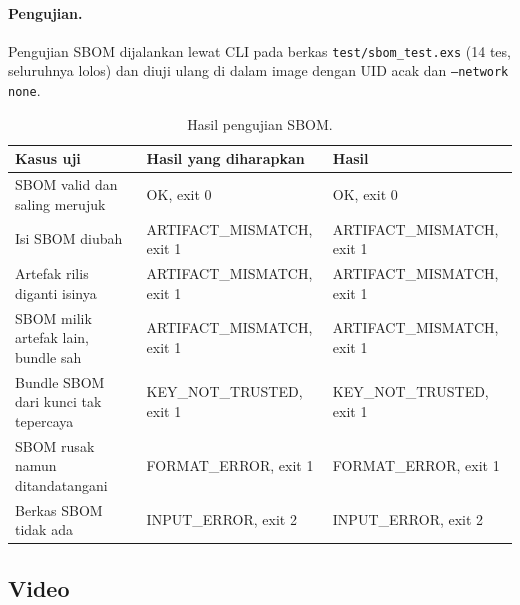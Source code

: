 \paragraph{Pengujian.}
Pengujian SBOM dijalankan lewat CLI pada berkas \texttt{test/sbom\_test.exs} (14 tes, seluruhnya
lolos) dan diuji ulang di dalam image dengan UID acak dan \texttt{--network none}.

\begin{table}[H]
\centering
\begin{tabular}{@{}lll@{}}
\toprule
Kasus uji & Hasil yang diharapkan & Hasil \\
\midrule
SBOM valid dan saling merujuk & OK, exit 0 & OK, exit 0 \\
Isi SBOM diubah & ARTIFACT\_MISMATCH, exit 1 & ARTIFACT\_MISMATCH, exit 1 \\
Artefak rilis diganti isinya & ARTIFACT\_MISMATCH, exit 1 & ARTIFACT\_MISMATCH, exit 1 \\
SBOM milik artefak lain, bundle sah & ARTIFACT\_MISMATCH, exit 1 & ARTIFACT\_MISMATCH, exit 1 \\
Bundle SBOM dari kunci tak tepercaya & KEY\_NOT\_TRUSTED, exit 1 & KEY\_NOT\_TRUSTED, exit 1 \\
SBOM rusak namun ditandatangani & FORMAT\_ERROR, exit 1 & FORMAT\_ERROR, exit 1 \\
Berkas SBOM tidak ada & INPUT\_ERROR, exit 2 & INPUT\_ERROR, exit 2 \\
\bottomrule
\end{tabular}
\caption{Hasil pengujian SBOM.}
\end{table}

\subsection{Video}
